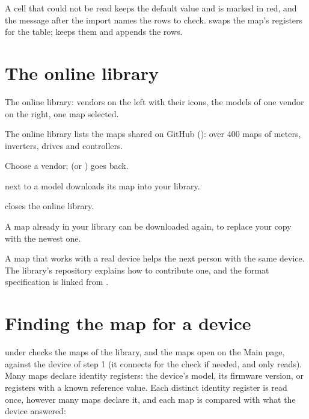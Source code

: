 A cell that could not be read keeps the default value and is marked in red,
and the message after the import names the rows to check.
 swaps the map's registers for the table;
 keeps them and appends the rows.

\section{The online library}

  {The online library: vendors on the left with their icons, the models of one
   vendor on the right, one map selected.}

The online library lists the maps shared on GitHub
(): over 400 maps of meters,
inverters, drives and controllers.

\begin{steps}
  \item Choose a vendor;  (or ) goes back.
  \item {} next to a model downloads its map into your library.
  \item {} closes the online library.
\end{steps}

A map already in your library can be downloaded again, to replace your copy
with the newest one.

\begin{tip}
A map that works with a real device helps the next person with the same
device. The library's repository explains how to contribute one, and the
format specification is linked from .
\end{tip}

\section{Finding the map for a device}
\label{sec:find-map}

 under  checks the maps of the library,
and the maps open on the Main page, against the device of step 1 (it connects
for the check if needed, and only reads). Many maps declare identity
registers: the device's model, its firmware version, or registers with a known
reference value. Each distinct identity register is read once, however many
maps declare it, and each map is compared with what the device answered:


